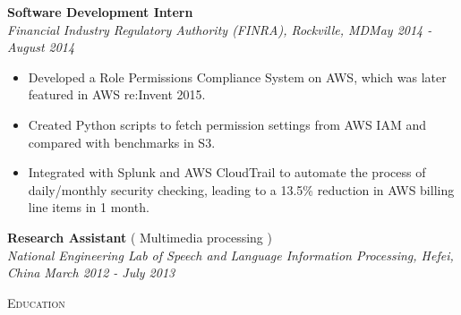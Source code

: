 \documentclass[3pt]{article}
\newenvironment{changemargin}[2]{%
  \begin{list}{}{%
    \setlength{\topsep}{0pt}%
    \setlength{\leftmargin}{#1}%
    \setlength{\rightmargin}{#2}%
    \setlength{\listparindent}{\parindent}%
    \setlength{\itemindent}{\parindent}%
    \setlength{\parsep}{\parskip}%
  }%
  \item[]}{\end{list}
}
\newcommand{\lineover}{
	\begin{changemargin}{-0.05in}{-0.05in}
		\vspace*{-8pt}
		\hrulefill \\
		\vspace*{-2pt}
	\end{changemargin}
}
\newcommand{\header}[1]{
	\begin{changemargin}{-0.5in}{-0.5in}
		{\Large \scshape{#1}}\\
  	\lineover
	\end{changemargin}
}
\newenvironment{body} {
	\vspace*{-16pt}
	\begin{changemargin}{-0.25in}{-0.5in}
  }	
	{\end{changemargin}
}
\begin{document}
\begin{body}
    \textbf{Software Development Intern} \\

    \emph{Financial Industry Regulatory Authority (FINRA), Rockville, MD}\hfill \emph{May 2014 - August 2014}\\
     \begin{itemize} \itemsep -0.5pt
    \item{Developed a Role Permissions Compliance System on AWS, which was later featured in AWS re:Invent 2015.}
     \item {Created Python scripts to fetch permission settings from AWS IAM and compared with benchmarks in S3.}
     \item {Integrated with Splunk and AWS CloudTrail to automate the process of daily/monthly security checking, leading to a 13.5\% reduction in AWS billing line items in 1 month.}
   
    \end{itemize}
	
	\vspace{1pt}
    \textbf{Research Assistant} ( Multimedia processing )\\
    \emph{National Engineering Lab of Speech and Language Information Processing,  Hefei, China } \hfill \emph{March 2012 - July 2013 }

\end{body}
\bigskip


\header{Education}
\end{document}
